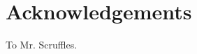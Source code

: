 
\cleardoublepage
\thispagestyle{empty}

\chapter{Acknowledgements}
To Mr. Scruffles.

\cleardoublepage
